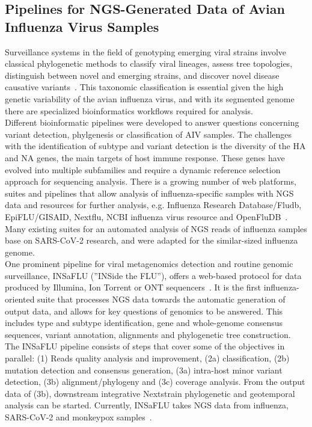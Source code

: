 \subsection{Pipelines for NGS-Generated Data of Avian Influenza Virus Samples}
Surveillance systems in the field of genotyping emerging viral strains involve classical phylogenetic methods to classify viral lineages, assess tree topologies, distinguish between novel and emerging strains, and discover novel disease causative variants~\cite{koboldt2013next}. This taxonomic classification is essential given the high genetic variability of the avian influenza virus, and with its segmented genome there are specialized bioinformatics workflows required for analysis. \\
Different bioinformatic pipelines were developed to answer questions concerning variant detection, phylgenesis or classification of AIV samples. The challenges with the identification of subtype and variant detection is the diversity of the HA and NA genes, the main targets of host immune response. These genes have evolved into multiple subfamilies and require a dynamic reference selection approach for sequencing analysis. There is a growing number of web platforms, suites and pipelines that allow analysis of influenza-specific samples with NGS data and resources for further analysis, e.g. Influenza Research Database/Fludb, EpiFLU/GISAID, Nextflu, NCBI influenza virus resource and OpenFluDB~\cite{zhang2017influenza, shu2017gisaid, neher2015nextflu, bao2008influenza, liechti2010openfludb}. Many existing suites for an automated analysis of NGS reads of influenza samples base on SARS-CoV-2 research, and were adapted for the similar-sized influenza genome. \\
One prominent pipeline for viral metagenomics detection and routine genomic surveillance, INSaFLU (''INSide the FLU''), offers a web-based protocol for data produced by Illumina, Ion Torrent or ONT sequencers~\cite{borges2018insaflu}. It is the first influenza-oriented suite that processes NGS data towards the automatic generation of output data, and allows for key questions of genomics to be answered. This includes type and subtype identification, gene and whole-genome consensus sequences, variant annotation, alignments and phylogenetic tree construction. The INSaFLU pipeline consists of steps that cover some of the objectives in parallel: (1) Reads quality analysis and improvement, (2a) classification, (2b) mutation detection and consensus generation, (3a) intra-host minor variant detection, (3b) alignment/phylogeny and (3c) coverage analysis. From the output data of (3b), downstream integrative Nextstrain phylogenetic and geotemporal analysis can be started. Currently, INSaFLU takes NGS data from influenza, SARS-CoV-2 and monkeypox samples~\cite{borges2018insaflu}. \\
